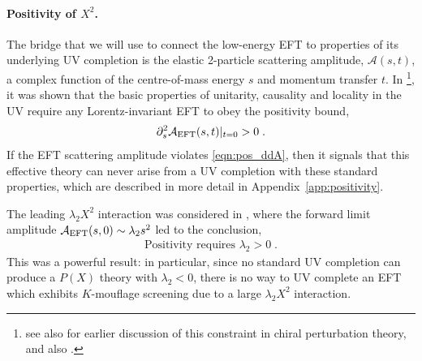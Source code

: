 \documentclass[11pt]{article}
\begin{document}
\paragraph{Positivity of $X^2$.}
The bridge that we will use to connect the low-energy EFT to properties of its underlying  UV completion is the elastic 2-particle scattering amplitude, $\mathcal{A} (s,t)$, a complex function of the centre-of-mass energy $s$ and momentum transfer $t$.
In \cite{Adams:2006sv}\footnote{see also \cite{Pham:1985cr,Ananthanarayan:1994hf,Pennington:1994kc,Comellas:1995hq} for earlier discussion of this constraint in chiral perturbation theory, and also \cite{Jenkins:2006ia,Dvali:2012zc}.}, 
it was shown that the basic properties of unitarity, causality and locality in the UV require any Lorentz-invariant EFT to obey the positivity bound,
\begin{align}
 \partial_s^2 \mathcal{A}_{\rm EFT} (s, t) |_{t=0}  > 0 \; .
 \label{eqn:pos_ddA}
\end{align}
If the EFT scattering amplitude violates \eqref{eqn:pos_ddA}, then it signals that this effective theory can never arise from a UV completion with these standard properties, which are described in more detail in Appendix~\ref{app:positivity}. 

The leading $\lambda_2 X^2$ interaction was considered in \cite{Adams:2006sv, Dvali:2012zc}, where the forward limit amplitude $\mathcal{A}_{\rm EFT} (s,0) \sim \lambda_2 s^2$ led to the conclusion,
\begin{align}
 \text{Positivity requires } \lambda_2 > 0 \; .
\end{align}
This was a powerful result: in particular, since no standard UV completion can produce a $P(X)$ theory with $\lambda_2 <0$, there is no way to UV complete an EFT which exhibits $K$-mouflage screening due to a large $ \lambda_2 X^2$ interaction. 


\end{document}

